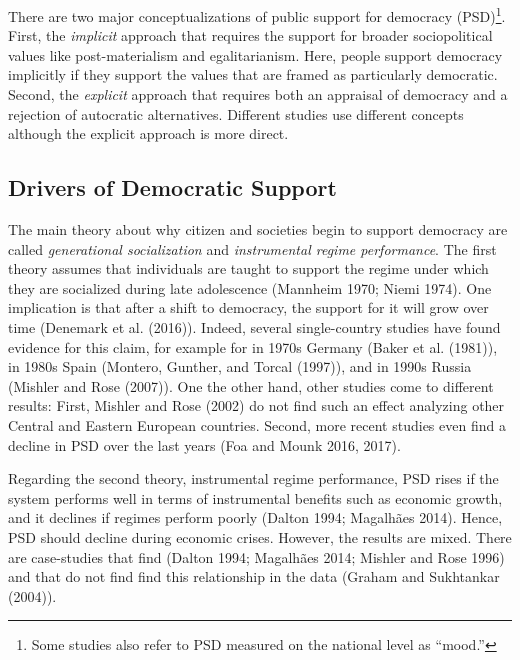 \documentclass[12pt,english,a4paper,oneside]{article}
\theoremstyle{definition}
\theoremstyle{definition}
\theoremstyle{definition}
\theoremstyle{definition}
\theoremstyle{remark}
\begin{document}
There are two major conceptualizations of public support for democracy (PSD)\footnote{Some studies also refer to PSD measured on the national level as \enquote{mood.}}. First, the \emph{implicit} approach that requires the support for broader sociopolitical values like post-materialism and egalitarianism. Here, people support democracy implicitly if they support the values that are framed as particularly democratic. Second, the \emph{explicit} approach that requires both an appraisal of democracy and a rejection of autocratic alternatives. Different studies use different concepts although the explicit approach is more direct.

\hypertarget{drivers-of-democratic-support}{%
\subsection{Drivers of Democratic Support}\label{drivers-of-democratic-support}}

The main theory about why citizen and societies begin to support democracy are called \emph{generational socialization} and \emph{instrumental regime performance}. The first theory assumes that individuals are taught to support the regime under which they are socialized during late adolescence (Mannheim 1970; Niemi 1974). One implication is that after a shift to democracy, the support for it will grow over time (Denemark et al. (2016)). Indeed, several single-country studies have found evidence for this claim, for example for in 1970s Germany (Baker et al. (1981)), in 1980s Spain (Montero, Gunther, and Torcal (1997)), and in 1990s Russia (Mishler and Rose (2007)). One the other hand, other studies come to different results: First, Mishler and Rose (2002) do not find such an effect analyzing other Central and Eastern European countries. Second, more recent studies even find a decline in PSD over the last years (Foa and Mounk 2016, 2017).

Regarding the second theory, instrumental regime performance, PSD rises if the system performs well in terms of instrumental benefits such as economic growth, and it declines if regimes perform poorly (Dalton 1994; Magalhães 2014). Hence, PSD should decline during economic crises. However, the results are mixed. There are case-studies that find (Dalton 1994; Magalhães 2014; Mishler and Rose 1996) and that do not find find this relationship in the data (Graham and Sukhtankar (2004)).
\end{document}
